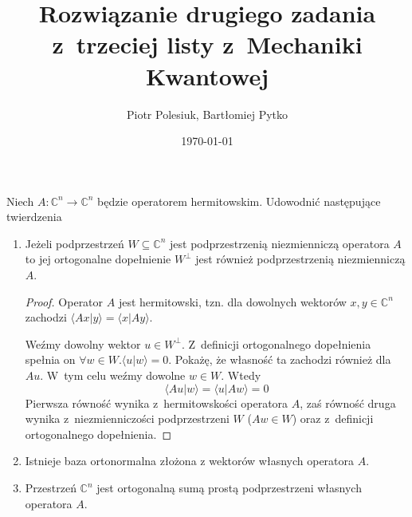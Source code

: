 \documentclass{article}
\title{Rozwiązanie drugiego zadania z~trzeciej listy z~Mechaniki Kwantowej}
\author{Piotr Polesiuk, Bartłomiej Pytko}
\date{\today}
\begin{document}
\maketitle

Niech $A\colon\mathbb{C}^n\to \mathbb{C}^n$
będzie operatorem hermitowskim. Udowodnić następujące twierdzenia
\begin{enumerate}
\item
Jeżeli podprzestrzeń $W\subseteq \mathbb{C}^n$ jest podprzestrzenią
niezmienniczą operatora $A$ to jej ortogonalne dopełnienie
$W^\perp$ jest również podprzestrzenią niezmienniczą $A$.

\begin{proof}
Operator $A$ jest hermitowski, tzn. dla dowolnych wektorów 
$x,y\in\mathbb{C}^n$ zachodzi 
\mbox{$\langle{}Ax|y\rangle=\langle{}x|Ay\rangle$}.

Weźmy dowolny wektor $u\in W^\perp$. Z~definicji ortogonalnego dopełnienia 
spełnia on $\forall w\in W.\langle{}u|w\rangle=0$. Pokażę, że własność ta 
zachodzi również dla $Au$. W~tym celu weźmy dowolne $w\in W$. Wtedy
\[
\langle{}Au|w\rangle = \langle{}u|Aw\rangle = 0
\]
Pierwsza równość wynika z~hermitowskości operatora $A$, zaś równość 
druga wynika z~niezmienniczości podprzestrzeni $W$ ($Aw \in W$) oraz 
z~definicji ortogonalnego dopełnienia.
\end{proof}

\item
Istnieje baza ortonormalna złożona z wektorów własnych operatora $A$.

\item
Przestrzeń $\mathbb{C}^n$ jest ortogonalną sumą prostą podprzestrzeni własnych
operatora $A$.
\end{enumerate}
\end{document}
